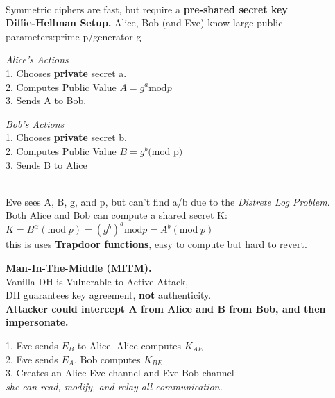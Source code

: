 \documentclass[main.tex]{subfiles}
\begin{document}
\begin{minipage}[t]{0.495\textwidth}
{\begin{minipage}[htp]{0.97\textwidth}
		\end{minipage}
	}\\
	Symmetric ciphers are fast, but require a \textbf{pre-shared secret key}\\
	\textbf{Diffie-Hellman Setup.} Alice, Bob (and Eve) know large public parameters:prime p/generator g\\
	\begin{minipage}[htp]{0.5\textwidth}
		\textit{Alice's Actions}\\
		1. Chooses \textbf{private} secret a.\\
		2. Computes Public Value $A = g^a \text{mod}p$\\
		3. Sends A to Bob.
	\end{minipage}
	\begin{minipage}[htp]{0.5\textwidth}
		\textit{Bob's Actions}\\
		1. Chooses \textbf{private} secret b.\\
		2. Computes Public Value $B = g^b \text{(mod p)}$\\
		3. Sends B to Alice
	\end{minipage}\\
	Eve sees A, B, g, and p, but can't find a/b due to the \textit{Distrete Log Problem}.\\
	Both Alice and Bob can compute a shared secret K:
	$K = B^{\alpha} (\text{mod}\;p) = (g^b)^a \text{mod} p = A^b (\text{mod} \; p)$\\
	this is uses \textbf{Trapdoor functions}, easy to compute but hard to revert.
	\hline\\
	\begin{minipage}[t]{0.47\textwidth}
		\textbf{Man-In-The-Middle (MITM).} \\Vanilla DH is Vulnerable to Active Attack,\\
		DH guarantees key agreement, \textbf{not} authenticity.\\
		\textbf{Attacker could intercept A from Alice and B from Bob, and then impersonate.}
	\end{minipage}
	\begin{minipage}[t]{0.53\textwidth}
		1. Eve sends $E_{B}$ to Alice. Alice computes $K_{AE}$\\
		2. Eve sends $E_{A}$. Bob computes $K_{BE}$\\
		3. Creates an Alice-Eve channel and Eve-Bob channel\\
		\textit{she can read, modify, and relay all communication.}
	\end{minipage}\hline

\end{minipage}
\end{document}
